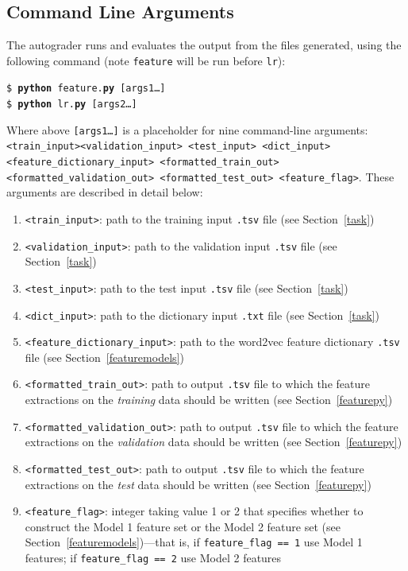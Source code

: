 \documentclass[11pt,addpoints,answers]{exam}
\begin{document}
\subsection{Command Line Arguments}\label{commandline}
The autograder runs and evaluates the output from the files generated, using the following command (note \lstinline{feature} will be run before \lstinline{lr}):

\begin{tabbing}
\=\texttt{\$ \textbf{python} feature.\textbf{py} [args1\dots]}\\
\>\texttt{\$ \textbf{python} lr.\textbf{py} [args2\dots]}
\end{tabbing}

Where above \texttt{[args1\dots]} is a placeholder for nine command-line arguments: \texttt{<train\_input>}\newline \texttt{<validation\_input> <test\_input> <dict\_input>  <feature\_dictionary\_input> \newline <formatted\_train\_out> <formatted\_validation\_out>  <formatted\_test\_out> \newline <feature\_flag>}. These arguments are described in detail below:
\begin{enumerate}
    \item \texttt{<train\_input>}: path to the training input \texttt{.tsv} file (see Section~\ref{task})
    \item \texttt{<validation\_input>}: path to the validation input \texttt{.tsv} file (see Section~\ref{task})
    \item \texttt{<test\_input>}: path to the test input \texttt{.tsv} file (see Section~\ref{task})
    \item \texttt{<dict\_input>}: path to the dictionary input \texttt{.txt} file (see Section~\ref{task})
    \item \texttt{<feature\_dictionary\_input>}: path to the word2vec feature dictionary \texttt{.tsv} file (see Section~\ref{featuremodels})
    \item \texttt{<formatted\_train\_out>}: path to output \texttt{.tsv} file to which the feature extractions on the \emph{training} data should be written (see Section~\ref{featurepy})
    \item \texttt{<formatted\_validation\_out>}: path to output \texttt{.tsv} file to which the feature extractions on the \emph{validation} data should be written (see Section~\ref{featurepy})
    \item \texttt{<formatted\_test\_out>}: path to output \texttt{.tsv} file to which the feature extractions on the \emph{test} data should be written (see Section~\ref{featurepy})
    \item \texttt{<feature\_flag>}: integer taking value 1 or 2 that specifies whether to construct the Model 1 feature set or the Model 2 feature set (see Section~\ref{featuremodels})---that is, if \texttt{feature\_flag == 1} use Model 1 features; if \texttt{feature\_flag == 2} use Model 2 features
\end{enumerate}
\end{document}
